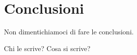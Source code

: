 \clearpage{\pagestyle{empty}\cleardoublepage}
\chapter*{Conclusioni}


Non dimentichiamoci di fare le conclusioni.

Chi le scrive? Cosa si scrive?
